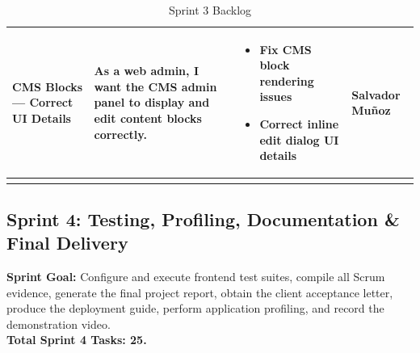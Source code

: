 \documentclass[letterpaper%
, oneside%
, 12pt%
, memoireprojet%
, english%
,creativecommons,hyperref, withAlgo2e %
]{thETS}
\begin{document}
\begin{longtable}{|p{3.2cm}|p{4.4cm}|p{5.4cm}|p{3.0cm}|}
CMS Blocks — Correct UI Details & As a web admin, I want the CMS admin panel to display and edit content blocks correctly. & \begin{itemize}\setlength{\itemsep}{2pt}
    \item Fix CMS block rendering issues
    \item Correct inline edit dialog UI details
\end{itemize} & Salvador Muñoz \\ \hline
\caption{Sprint 3 Backlog}
\label{tab:sprint3_backlog}
\end{longtable}
\endgroup

\subsection{Sprint 4: Testing, Profiling, Documentation \& Final Delivery}
\textbf{Sprint Goal:} Configure and execute frontend test suites, compile all Scrum evidence, generate the final project report, obtain the client acceptance letter, produce the deployment guide, perform application profiling, and record the demonstration video. \\
\textbf{Total Sprint 4 Tasks: 25.}
\end{document}
